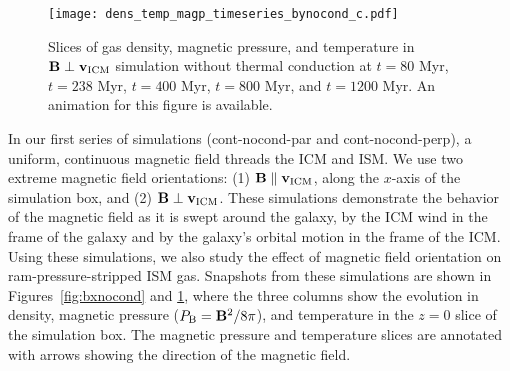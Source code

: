 \documentclass[twocolumn]{aastex6}
\begin{document}
\begin{figure*}[!htbp]
  \begin{center}
    {\texttt{[image: dens\_temp\_magp\_timeseries\_bynocond\_c.pdf]}}
     \caption{Slices of gas density, magnetic pressure, and temperature in $\mathbf{B} \perp \mathbf{v_{\rm ICM}}$ simulation without thermal conduction at $t = 80$ Myr, $t = 238$ Myr, $t = 400$ Myr, $t = 800$ Myr, and $t = 1200$ Myr. An animation for this figure is available.\label{fig:bynocond}}
  \end{center}  
\end{figure*}


In our first series of simulations (cont-nocond-par and cont-nocond-perp), a uniform, continuous magnetic field threads the ICM and ISM. We use two extreme magnetic field orientations: (1) $\mathbf{B} \parallel \mathbf{v_{\rm ICM}}$, along the $x$-axis of the simulation box, and (2) $\mathbf{B} \perp \mathbf{v_{\rm ICM}}$. These simulations demonstrate the behavior of the magnetic field as it is swept around the galaxy, by the ICM wind in the frame of the galaxy and by the galaxy's orbital motion in the frame of the ICM. Using these simulations, we also study the effect of magnetic field orientation on ram-pressure-stripped ISM gas. Snapshots from these simulations are shown in Figures~\ref{fig:bxnocond} and \ref{fig:bynocond},  where the three columns show the evolution in density, magnetic pressure ($P_{\rm B} = \mathbf{B}^2 / 8 \pi$), and temperature in the $z = 0$ slice of the simulation box. The magnetic pressure and temperature slices are annotated with arrows showing the direction of the magnetic field.
\end{document}
